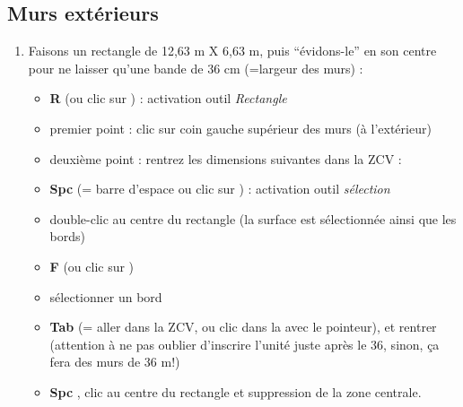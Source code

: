 \documentclass[a4paper,12pt,french]{sphinxmanual}
\begin{document}
\subsection{Murs extérieurs}
\label{init_su+acad/003_su1:murs-exterieurs}\begin{enumerate}
\item {} 
Faisons un rectangle de 12,63 m X 6,63 m, puis ``évidons-le'' en son centre pour ne laisser qu'une bande de 36 cm (=largeur des murs) :
\begin{itemize}
\item {} 
\textbf{R} (ou clic sur ) : activation outil \emph{Rectangle}

\item {} 
premier point : clic sur coin gauche supérieur des murs (à l'extérieur)

\item {} 
deuxième point : rentrez les dimensions suivantes dans la ZCV : 

\item {} 
\textbf{Spc} (= barre d'espace ou clic sur ) : activation outil \emph{sélection}

\item {} 
double-clic au centre du rectangle (la surface est sélectionnée ainsi que les bords)

\item {} 
\textbf{F} (ou clic sur )

\item {} 
sélectionner un bord

\item {} 
\textbf{Tab} (= aller dans la ZCV, ou clic dans la  avec le pointeur), et rentrer \sphinxcode{36cm} (attention à ne pas oublier d'inscrire l'unité  juste après le 36, sinon, ça fera des murs de 36 m!)

\item {} 
\textbf{Spc} , clic au centre du rectangle et suppression de la zone centrale.

\end{itemize}

\end{enumerate}
\end{document}
